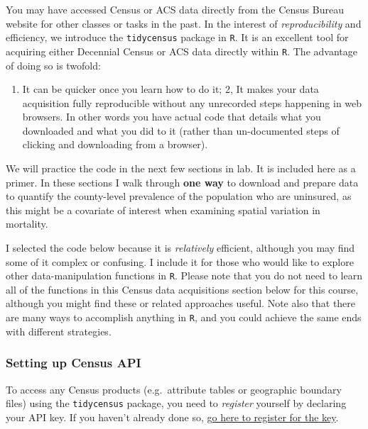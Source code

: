 \documentclass[
]{book}
\providecommand{\tightlist}{%
  \setlength{\itemsep}{0pt}\setlength{\parskip}{0pt}}
\newenvironment{rmdnote}[1]
  {
  \begin{itemize}
  \renewcommand{\labelitemi}{
    \raisebox{-.7\height}[0pt][0pt]{
      {\setkeys{Gin}{width=3em,keepaspectratio}\texttt{[image: images/\#1]}}
    }
  }
  \setlength{\fboxsep}{1em}
  \begin{note}
  \item
  }
  {
  \end{note}
  \end{itemize}
  }
\begin{document}
You may have accessed Census or ACS data directly from the Census Bureau website for other classes or tasks in the past. In the interest of \emph{reproducibility} and efficiency, we introduce the \texttt{tidycensus} package in \texttt{R}. It is an excellent tool for acquiring either Decennial Census or ACS data directly within \texttt{R}. The advantage of doing so is twofold:

\begin{enumerate}
\def\labelenumi{\arabic{enumi}.}
\tightlist
\item
  It can be quicker once you learn how to do it;
  2, It makes your data acquisition fully reproducible without any unrecorded steps happening in web browsers. In other words you have actual code that details what you downloaded and what you did to it (rather than un-documented steps of clicking and downloading from a browser).
\end{enumerate}

\begin{rmdnote}{note}
We will practice the code in the next few sections in lab. It is included here as a primer. In these sections I walk through \textbf{one way} to download and prepare data to quantify the county-level prevalence of the population who are uninsured, as this might be a covariate of interest when examining spatial variation in mortality.

I selected the code below because it is \emph{relatively} efficient, although you may find some of it complex or confusing. I include it for those who would like to explore other data-manipulation functions in \texttt{R}. Please note that you do not need to learn all of the functions in this Census data acquisitions section below for this course, although you might find these or related approaches useful. Note also that there are many ways to accomplish anything in \texttt{R}, and you could achieve the same ends with different strategies.

\end{rmdnote}

\hypertarget{setting-up-census-api}{%
\subsubsection{Setting up Census API}\label{setting-up-census-api}}

To access any Census products (e.g.~attribute tables or geographic boundary files) using the \texttt{tidycensus} package, you need to \emph{register} yourself by declaring your API key. If you haven't already done so, \href{https://api.census.gov/data/key_signup.html}{go here to register for the key}.
\end{document}
